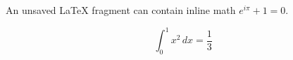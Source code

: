 An unsaved LaTeX fragment can contain inline math $e^{i\pi}+1=0$.

\[
  \int_0^1 x^2\,dx = \frac{1}{3}
\]

